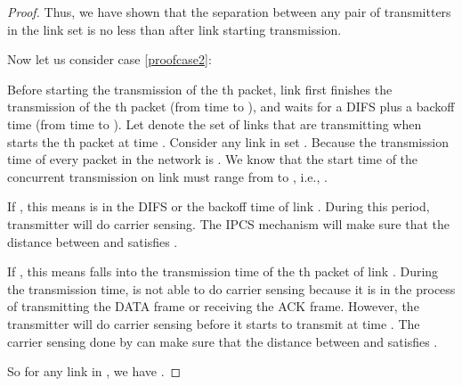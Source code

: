 \documentclass[conference]{IEEEtran}
\begin{document}
\begin{proof}
Thus, we have shown that the separation between any pair of
transmitters in the link set  is no less
than  after link
 starting transmission.



Now let us consider case \ref{proofcase2}:

Before starting the transmission of the th packet, link 
f\/irst f\/inishes the transmission of the th packet (from time
 to ), and waits for a DIFS plus a
backoff time (from time  to ). Let
 denote the set of links that are transmitting
when  starts the th packet at time . Consider
any link  in set . Because the transmission
time of every packet in the network is . We know that
the start time  of the concurrent transmission on link 
must range from  to , i.e., .

If , this means  is in the
DIFS or the backoff time of link . During this period,
transmitter  will do carrier sensing. The IPCS mechanism will
make sure that the distance between  and  satisf\/ies
.

If , this means  falls into the
transmission time of the th packet of link . During the
transmission time,  is not able to do carrier sensing because
it is in the process of transmitting the DATA frame or receiving the
ACK frame. However, the transmitter  will do carrier sensing
before it starts to transmit at time . The carrier sensing done
by  can make sure that the distance between  and 
satisf\/ies .

So for any link  in , we have
.



\end{proof}
\end{document}
